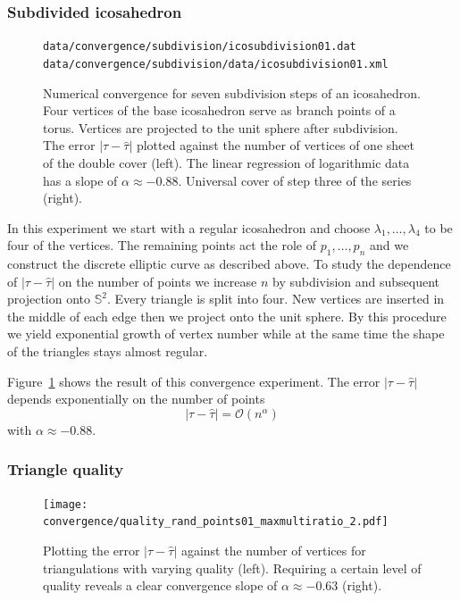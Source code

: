 \documentclass[Thesis]{subfiles}
\begin{document}
\subsubsection{Subdivided icosahedron}

\begin{figure}
\centering
{}
{\scriptsize\tt data/convergence/subdivision/icosubdivision01.dat}\\
{\scriptsize\tt data/convergence/subdivision/data/icosubdivision01.xml}
\caption{Numerical convergence for seven subdivision steps of an icosahedron.
Four vertices of the base icosahedron serve as branch points of a torus.
Vertices are projected to the unit sphere after subdivision.
The error $|\tau - \hat\tau|$ plotted against the number of vertices of one sheet of the double cover (left).
The linear regression of logarithmic data has a slope of $\alpha\approx-0.88$.
Universal cover of step three of the series (right).
}
\label{fig:convergence_subdivision}
\end{figure}

In this experiment we start with a regular icosahedron and choose $\lambda_1,\ldots,\lambda_4$ to be four of the vertices. The remaining points act the role of $p_1,\ldots,p_n$ and we construct the discrete elliptic curve as described above. To study the dependence of $|\tau-\hat \tau|$ on the number of points we increase $n$ by subdivision and subsequent projection onto $\mathbb S^2$. Every triangle is split into four. New vertices are inserted in the middle of each edge then we project onto the unit sphere. By this procedure we yield exponential growth of vertex number while at the same time the shape of the triangles stays almost regular.

Figure~\ref{fig:convergence_subdivision} shows the result of this convergence experiment. The error $|\tau-\hat \tau|$ depends exponentially on the number of points
\[|\tau-\hat \tau|=\mathcal O (n^\alpha)\]
with $\alpha \approx -0.88$.

\subsubsection{Triangle quality}

\begin{figure}
\centering
\texttt{[image: convergence/quality\_rand\_points01\_maxmultiratio\_2.pdf]}
\caption{Plotting the error $|\tau - \hat\tau|$ against the number of vertices for triangulations with varying quality (left). Requiring a certain level of quality reveals a clear convergence slope of $\alpha\approx -0.63$ (right).}
\label{fig:convergence_quality}
\end{figure}
\end{document}
